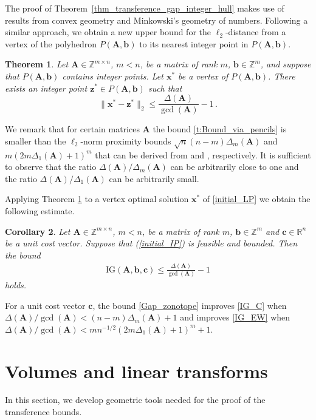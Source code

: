 \documentclass[runningheads]{llncs}
\newcommand{\ve}{\boldsymbol}
\newtheorem{thm}{Theorem}
\newtheorem{cor}[thm]{Corollary}
\newcommand{\be}{\begin{eqnarray}}
\newcommand{\ee}{\end{eqnarray}}
\newcommand{\R}{\mathbb R}
\newcommand{\Z}{\mathbb Z}
\newcommand{\KP}{{P}}
\renewcommand\>{\rangle}
\newcommand\<{\langle}
\newcommand\0{\mathbf{0}}
\newcommand\bb{\ve b}%
\newcommand\cc{\ve c}%
\renewcommand\AA{\ve A}%
\newcommand\IG{\mathrm{IG}}%
\begin{document}
The proof of Theorem~\ref{thm_transference_gap_integer_hull} makes use of results from convex geometry and  Minkowski's geometry of numbers. Following a similar approach, we obtain a new upper bound for the $\ell_2$-distance from 
a vertex of the polyhedron $\KP(\AA, {\ve b})$ to its nearest integer point in $\KP(\AA, {\ve b})$. 

\begin{thm}
\label{thm:UpperBound}
Let $\AA \in \Z^{m\times n}$, $m<n$, be a matrix of rank $m$, $\ve b \in \Z^m $, and suppose that $ \KP(\AA, {\ve b})$ contains integer points.  Let ${\ve x}^*$ be a vertex of  $ \KP(\AA, {\ve b})$. There
exists an integer point ${\ve z}^*\in \KP(\AA, {\ve b})$ such that
\begin{equation}\label{t:Bound_via_pencils}
\|{\ve x}^*-{\ve z}^*\|_2\le  \frac{\Delta(\AA)}{\gcd(\AA)}-1\,.
\end{equation}
\end{thm}
%
We remark that for certain matrices $\AA$ the bound \eqref{t:Bound_via_pencils} is smaller than the $\ell_2$-norm proximity bounds $\sqrt{n}(n-m)\Delta_m(\AA)$  and $m (2m\Delta_1(\AA)+1)^m$ that can be derived from \cite{CKPW} and \cite{MR3775840}, respectively.  It is sufficient to observe that the ratio $\Delta(\AA)/\Delta_m(\AA)$ can be arbitrarily close to one and the ratio  $\Delta(\AA)/\Delta_1(\AA)$ can be arbitrarily small.

Applying Theorem \ref{thm:UpperBound} to a vertex optimal solution ${\ve x}^*$ of \eqref{initial_LP} we obtain the following estimate.

\begin{cor}
\label{cor_gap_via_length} Let $\AA\in \Z^{m\times n}$, $m<n$, be a matrix of rank $m$, $\bb\in \Z^m$ and $\cc\in \R^n$ be a unit cost vector. Suppose that (\ref{initial_IP}) is feasible and bounded. Then the bound 
%
\be\label{Gap_zonotope} 
\IG(\AA,\bb,\cc)\le\frac{\Delta(\AA)}{\gcd(\AA)}-1
\ee
holds.
\end{cor}
%
For a unit cost vector ${\ve c}$, the bound \eqref{Gap_zonotope} improves   \eqref{IG_C} when $\Delta(\AA)/\gcd(\AA)<(n-m)\Delta_m(\AA)+1$ and improves  \eqref{IG_EW}  when $\Delta(\AA)/\gcd(\AA)<mn^{-1/2} (2m\Delta_1(\AA)+1)^m+1$.



\section{Volumes and linear transforms}

In this section, we develop geometric tools needed for the proof of the transference bounds. 
\end{document}
